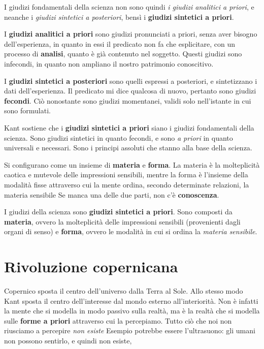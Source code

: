 \documentclass[a4paper, twoside, titlepage]{book}
\begin{document}
I giudizi fondamentali della scienza non sono quindi \textit{i giudizi analitici a priori}, e neanche i \textit{giudizi sintetici a posteriori}, bensì i \textbf{giudizi sintetici a priori}.

I \textbf{giudizi analitici a priori} sono giudizi pronunciati a priori, senza aver bisogno dell’esperienza, in quanto in essi il predicato non fa che esplicitare, con un processo di \textbf{analisi}, quanto è già contenuto nel soggetto.
Questi giudizi sono infecondi, in quanto non ampliano il nostro patrimonio conoscitivo.

I \textbf{giudizi sintetici a posteriori} sono quelli espressi a posteriori, e sintetizzano i dati dell’esperienza. Il predicato mi dice qualcosa di nuovo, pertanto sono giudizi \textbf{fecondi}. Ciò nonostante sono giudizi momentanei, validi solo nell’istante in cui sono formulati.

Kant sostiene che i \textbf{giudizi sintetici a priori} siano i giudizi fondamentali della scienza.
Sono giudizi sintetici in quanto fecondi, e sono \textit{a priori} in quanto universali e necessari.
Sono i principi assoluti che stanno alla base della scienza.

Si configurano come un insieme di \textbf{materia} e \textbf{forma}. 
La materia è la molteplicità caotica e mutevole delle impressioni sensibili, mentre la forma è l’insieme della modalità fisse attraverso cui la mente ordina, secondo determinate relazioni, la materia sensibile
Se manca una delle due parti, non c’è \textbf{conoscenza}.

I giudizi della scienza sono \textbf{giudizi sintetici a priori}. Sono composti da \textbf{materia}, ovvero la molteplicità delle impressioni sensibili (provenienti dagli organi di senso) e \textbf{forma}, ovvero le modalità in cui si ordina la \textit{materia sensibile}.

\section{Rivoluzione copernicana}

Copernico sposta il centro dell’universo dalla Terra al Sole. Allo stesso modo Kant sposta il centro dell’interesse dal mondo esterno all’interiorità.
Non è infatti la mente che si modella in modo passivo sulla realtà, ma è la realtà che si modella sulle \textbf{forme a priori} attraverso cui la percepiamo.
Tutto ciò che noi non riusciamo a percepire \textit{non esiste}
Esempio potrebbe essere l’ultrasuono: gli umani non possono sentirlo, e quindi non esiste,
\end{document}
